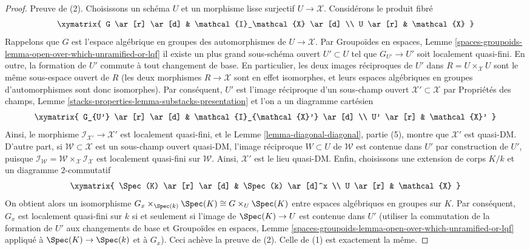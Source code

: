 \begin{proof}
Preuve de (2). Choisissons un schéma $U$ et un morphisme lisse surjectif
$U \to \mathcal{X}$. Considérons le produit fibré
$$
\xymatrix{
G \ar[r] \ar[d] & \mathcal{I}_\mathcal{X} \ar[d] \\
U \ar[r] & \mathcal{X}
}
$$
Rappelons que $G$ est l'espace algébrique en groupes des automorphismes de
$U \to \mathcal{X}$. Par Groupoïdes en espaces, Lemme
\ref{spaces-groupoids-lemma-open-over-which-unramified-or-lqf}
il existe un plus grand sous-schéma ouvert $U' \subset U$ tel que
$G_{U'} \to U'$ soit localement quasi-fini.
En outre, la formation de $U'$ commute à tout changement de base.
En particulier, les deux images réciproques de $U'$ dans
$R = U \times_\mathcal{X} U$ sont le même sous-espace ouvert de $R$
(les deux morphismes $R \to \mathcal{X}$ sont en effet isomorphes, et leurs
espaces algébriques en groupes d'automorphismes sont donc isomorphes).
Par conséquent, $U'$ est l'image réciproque d'un sous-champ ouvert
$\mathcal{X}' \subset \mathcal{X}$ par Propriétés des champs, Lemme
\ref{stacks-properties-lemma-substacks-presentation}
et l'on a un diagramme cartésien
$$
\xymatrix{
G_{U'} \ar[r] \ar[d] & \mathcal{I}_{\mathcal{X}'} \ar[d] \\
U' \ar[r] & \mathcal{X}'
}
$$
Ainsi, le morphisme $\mathcal{I}_{\mathcal{X}'} \to \mathcal{X}'$ est
localement quasi-fini, et le Lemme \ref{lemma-diagonal-diagonal}, partie (5),
montre que $\mathcal{X}'$ est quasi-DM. D'autre part, si
$\mathcal{W} \subset \mathcal{X}$ est un sous-champ ouvert quasi-DM,
l'image réciproque $W \subset U$ de $\mathcal{W}$ est contenue dans $U'$
par construction de $U'$, puisque
$\mathcal{I}_\mathcal{W} =
\mathcal{W} \times_\mathcal{X} \mathcal{I}_\mathcal{X}$
est localement quasi-fini sur $\mathcal{W}$.
Ainsi, $\mathcal{X}'$ est le lieu quasi-DM.
Enfin, choisissons une extension de corps $K/k$ et un diagramme
$2$-commutatif
$$
\xymatrix{
\Spec(K) \ar[r] \ar[d] & \Spec(k) \ar[d]^x \\
U \ar[r] & \mathcal{X}
}
$$
On obtient alors un isomorphisme
$G_x \times_{\Spec(k)} \Spec(K) \cong G \times_U \Spec(K)$
entre espaces algébriques en groupes sur $K$. Par conséquent, $G_x$ est
localement quasi-fini sur $k$ si et seulement si l'image de
$\Spec(K) \to U$ est contenue dans $U'$ (utiliser la commutation de la
formation de $U'$ aux changements de base et Groupoïdes en espaces,
Lemme
\ref{spaces-groupoids-lemma-open-over-which-unramified-or-lqf}
appliqué à $\Spec(K) \to \Spec(k)$ et à $G_x$).
Ceci achève la preuve de (2). Celle de (1) est exactement la même.
\end{proof}









